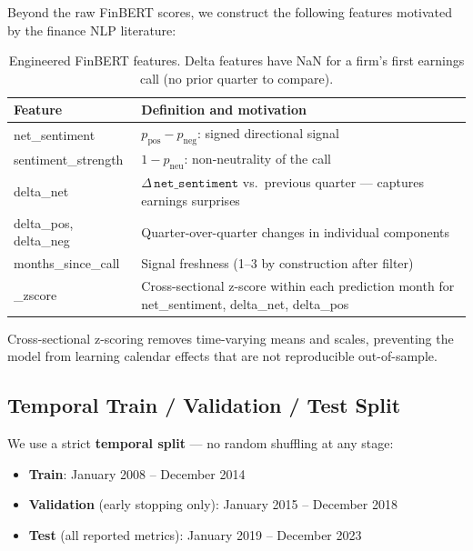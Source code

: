\documentclass[11pt, a4paper]{article}
\begin{document}
Beyond the raw FinBERT scores, we construct the following features motivated by
the finance NLP literature:

\begin{table}[H]
\centering
\caption{Engineered FinBERT features. Delta features have NaN for a firm's
first earnings call (no prior quarter to compare).}
\label{tab:features}
\begin{tabular}{>{\ttfamily}lp{9cm}}
\toprule
\normalfont\textbf{Feature} & \textbf{Definition and motivation} \\
\midrule
net\_sentiment      & $p_\text{pos} - p_\text{neg}$: signed directional signal \\
sentiment\_strength & $1 - p_\text{neu}$: non-neutrality of the call \\
delta\_net          & $\Delta\,\texttt{net\_sentiment}$ vs.\ previous quarter ---
                      captures earnings surprises \citep{huang2023} \\
delta\_pos, delta\_neg & Quarter-over-quarter changes in individual components \\
months\_since\_call & Signal freshness (1--3 by construction after filter) \\
*\_zscore           & Cross-sectional z-score within each prediction month
                      for net\_sentiment, delta\_net, delta\_pos \\
\bottomrule
\end{tabular}
\end{table}

Cross-sectional z-scoring removes time-varying means and scales, preventing the
model from learning calendar effects that are not reproducible out-of-sample.

\subsection{Temporal Train / Validation / Test Split}

We use a strict \textbf{temporal split} --- no random shuffling at any stage:
\begin{itemize}[noitemsep]
    \item \textbf{Train}: January 2008 -- December 2014
    \item \textbf{Validation} (early stopping only): January 2015 -- December 2018
    \item \textbf{Test} (all reported metrics): January 2019 -- December 2023
\end{itemize}
\end{document}
